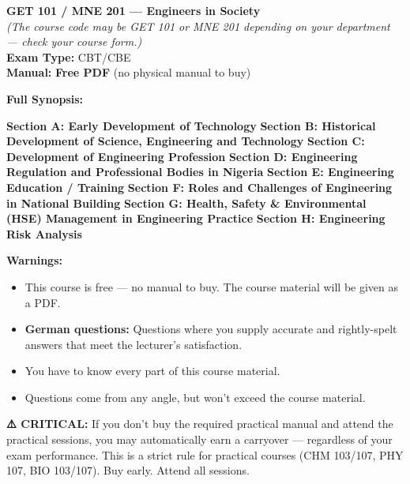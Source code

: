 \documentclass[11pt,a4paper]{article}
\begin{document}
\begin{coursebox}
    \textbf{\color{primary}\Large GET 101 / MNE 201 --- Engineers in Society}\\[0.3em]
    \textit{(The course code may be GET 101 or MNE 201 depending on your department --- check your course form.)}\\[0.3em]
    \textbf{Exam Type:} CBT/CBE \\
    \textbf{Manual:} \textbf{Free PDF} (no physical manual to buy)

    \vspace{0.8em}

    \textbf{Full Synopsis:}

    \textbf{Section A: Early Development of Technology}
    \textbf{Section B: Historical Development of Science, Engineering and Technology}
    \textbf{Section C: Development of Engineering Profession}    \textbf{Section D: Engineering Regulation and Professional Bodies in Nigeria}
    \textbf{Section E: Engineering Education / Training}
    \textbf{Section F: Roles and Challenges of Engineering in National Building}
    \textbf{Section G: Health, Safety \& Environmental (HSE) Management in Engineering Practice}
    \textbf{Section H: Engineering Risk Analysis}
    
    \vspace{0.8em}

    \textbf{\color{warningText}Warnings:}
    \begin{itemize}[leftmargin=1.5em, itemsep=0.2em]
        \item This course is free --- no manual to buy. The course material will be given as a PDF.
        \item \textbf{German questions:} Questions where you supply accurate and rightly-spelt answers that meet the lecturer's satisfaction.
        \item You have to know every part of this course material.
        \item Questions come from any angle, but won't exceed the course material.
    \end{itemize}
\end{coursebox}

 \item \textbf{\color{warningText}⚠️ CRITICAL:} If you don't buy the required practical manual and attend the practical sessions, you may automatically earn a carryover — regardless of your exam performance. This is a strict rule for practical courses (CHM 103/107, PHY 107, BIO 103/107). Buy early. Attend all sessions.
\end{document}
